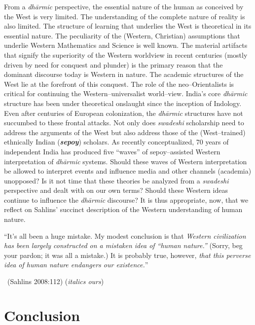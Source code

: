From a \textit{dhārmic} perspective, the essential nature of the human as conceived by the West is very limited. The understanding of the complete nature of reality is also limited. The structure of learning that underlies the West is theoretical in its essential nature. The peculiarity of the (Western, Christian) assumptions that underlie Western Mathematics and Science is well known. The material artifacts that signify the superiority of the Western worldview in recent centuries (mostly driven by need for conquest and plunder) is the primary reason that the dominant discourse today is Western in nature. The academic structures of the West lie at the forefront of this conquest. The role of the neo–Orientalists is critical for continuing the Western–universalist world–view. India's core \textit{dhārmic} structure has been under theoretical onslaught since the inception of Indology. Even after centuries of European colonization, the \textit{dhārmic} structures have not succumbed to these frontal attacks. Not only does \textit{swadeshi} scholarship need to address the arguments of the West but also address those of the (West–trained) ethnically Indian (\textbf{\textit{sepoy}}) scholars. As recently conceptualized, 70 years of independent India has produced five “waves” of sepoy–assisted Western interpretation of \textit{dhārmic} systems. Should these waves of Western interpretation be allowed to interpret events and influence media and other channels (academia) unopposed? Is it not time that these theories be analyzed from a \textit{swadeshi} perspective and dealt with on our own terms? Should these Western ideas continue to influence the \textit{dhārmic} discourse? It is thus appropriate, now, that we reflect on Sahlins' succinct description of the Western understanding of human nature.

\begin{myquote}
“It's all been a huge mistake. My modest conclusion is that \textit{Western civilization has been largely constructed on a mistaken idea of “human nature.”} (Sorry, beg your pardon; it was all a mistake.) It is probably true, however, \textit{that this perverse idea of human nature endangers our existence.}” 

~\hfill (Sahlins 2008:112) (\textit{italics ours})
\end{myquote}


\section*{Conclusion}

